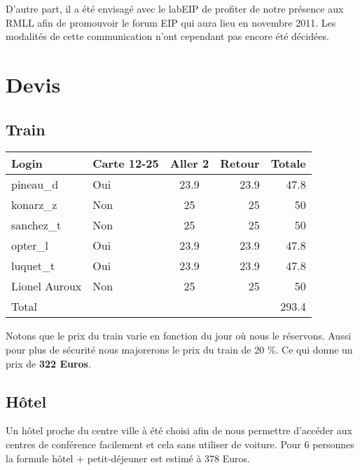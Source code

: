 \documentclass{rtxreport}
\begin{document}
D'autre part, il a été envisagé avec le labEIP de profiter de notre présence
aux RMLL afin de promouvoir le forum EIP qui aura lieu en novembre 2011.
Les modalités de cette communication n'ont cependant pas encore été décidées.

\chapter{Devis}

\section{Train}

\begin{tabular}{|l|l|c|r|r|}
  \hline
  Login &  Carte 12-25 & Aller 2 & Retour & Totale \\
  \hline
  pineau\_d & Oui & 23.9 & 23.9 & 47.8 \\
  konarz\_z & Non & 25 & 25 & 50 \\
  sanchez\_t & Non & 25 & 25 & 50 \\
  opter\_l & Oui & 23.9 & 23.9 & 47.8 \\
  luquet\_t & Oui & 23.9 & 23.9 & 47.8 \\
  Lionel Auroux & Non & 25 & 25 & 50  \\
  Total & & & & 293.4 \\
  \hline

\end{tabular}

Notons que le prix du train varie en fonction du jour où nous le réservons.
Aussi pour plus de sécurité nous majorerons le prix du train de 20 \%.  Ce qui
donne un prix de {\bf 322 Euros}.


\section{Hôtel}

Un hôtel proche du centre ville à été choisi afin de nous permettre d'accéder
aux centres de conférence facilement et cela sans utiliser de voiture.
Pour 6 personnes la formule hôtel + petit-déjeuner est estimé à 378 Euros.







\end{document}
